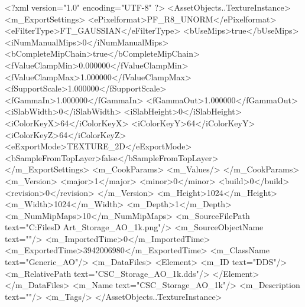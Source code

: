 <?xml version="1.0" encoding="UTF-8" ?>
<AssetObjects..TextureInstance>
	<m_ExportSettings>
		<ePixelformat>PF_R8_UNORM</ePixelformat>
		<eFilterType>FT_GAUSSIAN</eFilterType>
		<bUseMips>true</bUseMips>
		<iNumManualMips>0</iNumManualMips>
		<bCompleteMipChain>true</bCompleteMipChain>
		<fValueClampMin>0.000000</fValueClampMin>
		<fValueClampMax>1.000000</fValueClampMax>
		<fSupportScale>1.000000</fSupportScale>
		<fGammaIn>1.000000</fGammaIn>
		<fGammaOut>1.000000</fGammaOut>
		<iSlabWidth>0</iSlabWidth>
		<iSlabHeight>0</iSlabHeight>
		<iColorKeyX>64</iColorKeyX>
		<iColorKeyY>64</iColorKeyY>
		<iColorKeyZ>64</iColorKeyZ>
		<eExportMode>TEXTURE_2D</eExportMode>
		<bSampleFromTopLayer>false</bSampleFromTopLayer>
	</m_ExportSettings>
	<m_CookParams>
		<m_Values/>
	</m_CookParams>
	<m_Version>
		<major>1</major>
		<minor>0</minor>
		<build>0</build>
		<revision>0</revision>
	</m_Version>
	<m_Height>1024</m_Height>
	<m_Width>1024</m_Width>
	<m_Depth>1</m_Depth>
	<m_NumMipMaps>10</m_NumMipMaps>
	<m_SourceFilePath text="C:\Users\Shadow\Desktop\Working Files\3D Art\Textures\CSC_Storage_AO_1k.png"/>
	<m_SourceObjectName text=""/>
	<m_ImportedTime>0</m_ImportedTime>
	<m_ExportedTime>3942006980</m_ExportedTime>
	<m_ClassName text="Generic_AO"/>
	<m_DataFiles>
		<Element>
			<m_ID text="DDS"/>
			<m_RelativePath text="CSC_Storage_AO_1k.dds"/>
		</Element>
	</m_DataFiles>
	<m_Name text="CSC_Storage_AO_1k"/>
	<m_Description text=""/>
	<m_Tags/>
</AssetObjects..TextureInstance>

